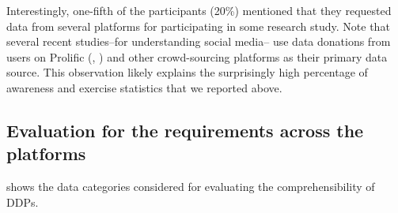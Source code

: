 Interestingly, one-fifth of the participants (20\%) mentioned that they requested data from several platforms for participating in some research study. 
Note that several recent studies--for understanding social media-- use data donations from users on Prolific (\cite{yang2024coupling}, \cite{vombatkere2024tiktok}) and other crowd-sourcing platforms as their primary data source.
This observation likely explains the surprisingly high percentage of awareness and exercise statistics that we reported above.
\fi 

\subsection{Evaluation for the requirements across the platforms}
\label{appendix:comparitive_study}

\noindent {} shows the data categories considered for evaluating the comprehensibility of DDPs.


